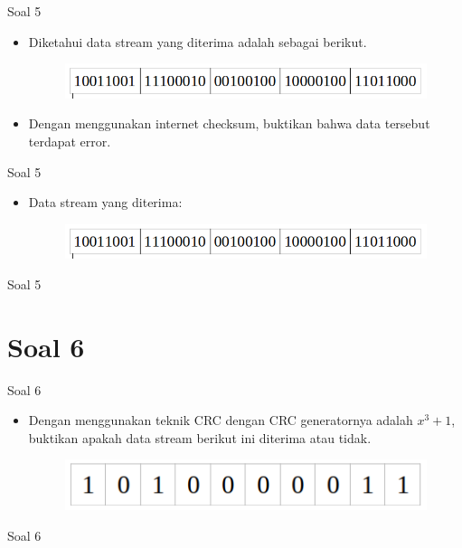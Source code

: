 \documentclass[aspectratio=169]{beamer}
\begin{document}
\begin{frame}[t]{Soal 5}
	\begin{itemize}
		\item Diketahui data stream yang diterima adalah sebagai berikut.
		
		\begin{figure}
			\centering
			\includegraphics[width=0.9\linewidth]{../../../soal/kuis/soal5_kuis2}
		\end{figure}
		
		\item Dengan menggunakan internet checksum, buktikan bahwa data tersebut terdapat error.
	\end{itemize}
\end{frame}

\begin{frame}[t]{Soal 5}
	\begin{itemize}
		\item Data stream yang diterima:
		\begin{figure}
			\centering
			\includegraphics[width=0.9\linewidth]{../../../soal/kuis/soal5_kuis2}
		\end{figure}
	\end{itemize}
\end{frame}

\begin{frame}[t]{Soal 5}
	
\end{frame}


\section{Soal 6}

\begin{frame}[t]{Soal 6}
	\begin{itemize}
		\item Dengan menggunakan teknik CRC dengan CRC generatornya adalah $ x^3 + 1 $, buktikan apakah data stream berikut ini diterima atau tidak.
		
		\begin{figure}
			\centering
			\includegraphics[width=0.4\linewidth]{../../../soal/kuis/soal6_kuis2}
		\end{figure}

	\end{itemize}
\end{frame}

\begin{frame}[t]{Soal 6}

\end{frame}
\end{document}
